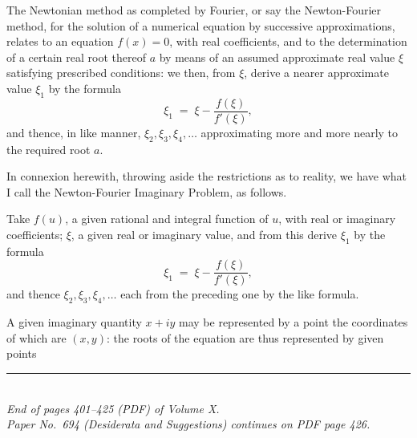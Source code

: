 \documentclass[11pt]{article}
\begin{document}
The Newtonian method as completed by Fourier, or say the Newton-Fourier method, for the solution of a numerical equation by successive approximations, relates to an equation $f(x) = 0$, with real coefficients, and to the determination of a certain real root thereof $a$ by means of an assumed approximate real value $\xi$ satisfying prescribed conditions: we then, from $\xi$, derive a nearer approximate value $\xi_{1}$ by the formula
\[
\xi_{1} \;=\; \xi - \frac{f(\xi)}{f'(\xi)},
\]
and thence, in like manner, $\xi_{2}, \xi_{3}, \xi_{4}, \ldots$ approximating more and more nearly to the required root $a$.

\medskip

In connexion herewith, throwing aside the restrictions as to reality, we have what I call the Newton-Fourier Imaginary Problem, as follows.

\medskip

Take $f(u)$, a given rational and integral function of $u$, with real or imaginary coefficients; $\xi$, a given real or imaginary value, and from this derive $\xi_{1}$ by the formula
\[
\xi_{1} \;=\; \xi - \frac{f(\xi)}{f'(\xi)},
\]
and thence $\xi_{2}, \xi_{3}, \xi_{4}, \ldots$ each from the preceding one by the like formula.

\medskip

A given imaginary quantity $x + iy$ may be represented by a point the coordinates of which are $(x, y)$: the roots of the equation are thus represented by given points

\bigskip
\bigskip

\begin{center}
\rule{0.4\textwidth}{0.4pt}\\[2pt]
\textit{End of pages 401--425 (PDF) of Volume X.}\\
\textit{Paper No.~694 (Desiderata and Suggestions) continues on PDF page 426.}
\end{center}
\end{document}
